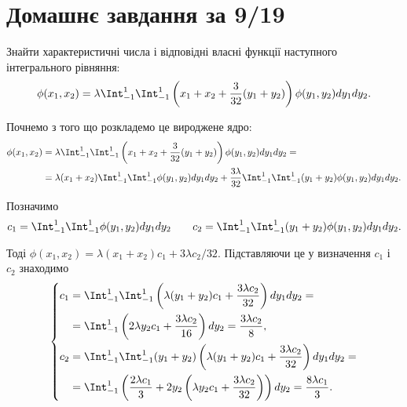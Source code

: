 \newcommand{\conjlambda}{\overline{\lambda}}

\setcounter{section}{2}

\section{Домашнє завдання за 9/19}

\begin{problem}[5.28.1, Владимиров]
    Знайти характеристичні числа і відповідні власні функції наступного інтегрального рівняння: 
    \[ 
        \phi(x_1, x_2) = \lambda \Int_{-1}^1 \Int_{-1}^1 \left(x_1 + x_2 + \dfrac{3}{32} (y_1 + y_2)\right) \phi(y_1, y_2) dy_1 dy_2. 
    \]
\end{problem}

\begin{solution}
    Почнемо з того що розкладемо це вироджене ядро:
    \begin{equation*}
        \begin{aligned}
            \phi(x_1, x_2) &= \lambda \Int_{-1}^1 \Int_{-1}^1 \left(x_1 + x_2 + \dfrac{3}{32} (y_1 + y_2)\right) \phi(y_1, y_2) dy_1 dy_2 = \\
            &= \lambda (x_1 + x_2) \Int_{-1}^1 \Int_{-1}^1 \phi(y_1, y_2) dy_1 dy_2 + \dfrac{3\lambda}{32} \Int_{-1}^1 \Int_{-1}^1 (y_1 + y_2) \phi(y_1, y_2) dy_1 dy_2. 
        \end{aligned}
    \end{equation*} 
    
    Позначимо
    \[
        c_1 = \Int_{-1}^1 \Int_{-1}^1 \phi(y_1, y_2) dy_1 dy_2 \qquad c_2 = \Int_{-1}^1 \Int_{-1}^1 (y_1 + y_2) \phi(y_1, y_2) dy_1 dy_2.
    \]
    
    Тоді $\phi(x_1, x_2) = \lambda (x_1 + x_2) c_1 + 3\lambda c_2 / 32$. Підставляючи це у визначення $c_1$ і $c_2$ знаходимо
    \begin{equation*}
        \left\{
            \begin{aligned}
                c_1 &= \Int_{-1}^1 \Int_{-1}^1 \left(\lambda (y_1 + y_2) c_1 + \dfrac{3\lambda c_2}{32} \right) dy_1 dy_2 = \\
                &= \Int_{-1}^1 \left(2\lambda y_2 c_1 + \dfrac{3\lambda c_2}{16}\right) dy_2 = \dfrac{3\lambda c_2}{8},  \\
                c_2 &= \Int_{-1}^1 \Int_{-1}^1 (y_1 + y_2) \left(\lambda (y_1 + y_2) c_1 + \dfrac{3 \lambda c_2}{32}\right) dy_1 dy_2 = \\ 
                &= \Int_{-1}^1 \left(\dfrac{2\lambda c_1}{3} + 2y_2\left(\lambda y_2c_1 + \dfrac{3\lambda c_2}{32}\right)\right) dy_2 = \dfrac{8\lambda c_1}{3}.
            \end{aligned}
        \right.
    \end{equation*}
    

\end{solution}
